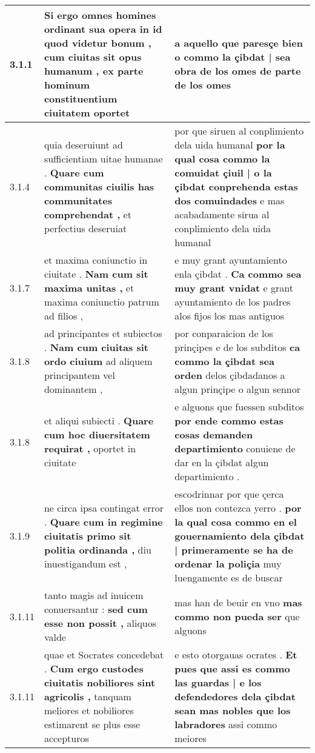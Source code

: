 \begin{tabular}{|p{1cm}|p{6.5cm}|p{6.5cm}|}
3.1.1 & Si ergo omnes homines ordinant sua opera in id quod videtur bonum , \textbf{ cum ciuitas sit opus humanum , } ex parte hominum constituentium ciuitatem oportet & a aquello que paresçe bien \textbf{ o commo la çibdat | sea obra de los omes } de parte de los omes \\\hline
3.1.4 & quia deseruiunt ad sufficientiam uitae humanae . \textbf{ Quare cum communitas ciuilis has communitates comprehendat , } et perfectius deseruiat & por que siruen al conplimiento dela uida humanal \textbf{ por la qual cosa commo la comuidat çiuil | o la çibdat conprehenda estas dos comuindades } e mas acabadamente sirua al conplimiento dela uida humanal \\\hline
3.1.7 & et maxima coniunctio in ciuitate . \textbf{ Nam cum sit maxima unitas , } et maxima coniunctio patrum ad filios , & e muy grant ayuntamiento enla çibdat . \textbf{ Ca commo sea muy grant vnidat } e grant ayuntamiento de los padres alos fijos los mas antiguos \\\hline
3.1.8 & ad principantes et subiectos . \textbf{ Nam cum ciuitas sit ordo ciuium } ad aliquem principantem vel dominantem , & por conparaicion de los prinçipes e de los subditos \textbf{ ca commo la çibdat sea orden } delos çibdadanos a algun prinçipe o algun sennor \\\hline
3.1.8 & et aliqui subiecti . \textbf{ Quare cum hoc diuersitatem requirat , } oportet in ciuitate & e alguons que fuessen subditos \textbf{ por ende commo estas cosas demanden departimiento } conuiene de dar en la çibdat algun departimiento . \\\hline
3.1.9 & ne circa ipsa contingat error . \textbf{ Quare cum in regimine ciuitatis primo sit politia ordinanda , } diu inuestigandum est , & escodrinnar por que çerca ellos non contezca yerro . \textbf{ por la qual cosa commo en el gouernamiento dela çibdat | primeramente se ha de ordenar la poliçia } muy luengamente es de buscar \\\hline
3.1.11 & tanto magis ad inuicem conuersantur : \textbf{ sed cum esse non possit , } aliquos valde & mas han de beuir en vno \textbf{ mas commo non pueda ser } que alguons \\\hline
3.1.11 & quae et Socrates concedebat . \textbf{ Cum ergo custodes ciuitatis nobiliores sint agricolis , } tanquam meliores et nobiliores estimarent se plus esse accepturos & e esto otorgauas ocrates . \textbf{ Et pues que assi es commo las guardas | e los defendedores dela çibdat sean mas nobles que los labradores } assi commo meiores \\\hline

\end{tabular}
